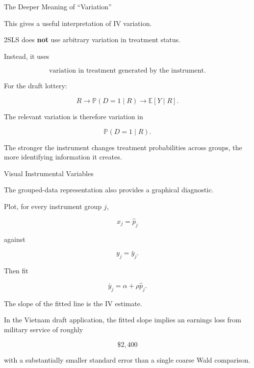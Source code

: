 \documentclass[aspectratio=169]{beamer}
\newcommand{\E}{\mathbb{E}}
\newcommand{\Prob}{\mathbb{P}}
\begin{document}
\begin{frame}{The Deeper Meaning of ``Variation''}

This gives a useful interpretation of IV variation.

2SLS does \textbf{not} use arbitrary variation in treatment status.

Instead, it uses

\[
\boxed{
\text{variation in treatment generated by the instrument}.
}
\]

For the draft lottery:

\[
R
\longrightarrow
\Prob(D=1\mid R)
\longrightarrow
\E[Y\mid R].
\]

The relevant variation is therefore variation in

\[
\Prob(D=1\mid R).
\]

The stronger the instrument changes treatment probabilities across groups, the more identifying information it creates.

\end{frame}

\begin{frame}{Visual Instrumental Variables}

The grouped-data representation also provides a graphical diagnostic.

Plot, for every instrument group \(j\),

\[
x_j=\hat p_j
\]

against

\[
y_j=\bar y_j.
\]

Then fit

\[
\bar y_j
=
\alpha+\rho\hat p_j.
\]

The slope of the fitted line is the IV estimate.

\vspace{0.3cm}

In the Vietnam draft application, the fitted slope implies an earnings loss from military service of roughly

\[
\boxed{\$2{,}400}
\]

with a substantially smaller standard error than a single coarse Wald comparison.

\end{frame}
\end{document}
